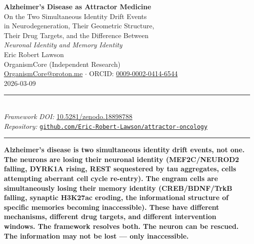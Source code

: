\documentclass[12pt,a4paper]{article}
\newenvironment{claimenv}{%
  \begin{tcolorbox}[colback=claimbox,colframe=claimbox,coltext=white,
    boxrule=0pt,arc=3pt,left=8pt,right=8pt,top=6pt,bottom=6pt,breakable]
  \bfseries\centering}{%
  \end{tcolorbox}}
\begin{document}

\begin{center}
  {\LARGE\bfseries\color{headerblue}
    Alzheimer's Disease as Attractor Medicine}\\[0.6em]

  {\large
    On the Two Simultaneous Identity Drift Events\\
    in Neurodegeneration, Their Geometric Structure,\\
    Their Drug Targets, and the Difference Between\\[0.3em]
    \textit{Neuronal Identity and Memory Identity}}\\[1.0em]

  {\normalsize Eric Robert Lawson}\\[0.2em]
  {\small OrganismCore (Independent Research)\\
    \href{mailto:OrganismCore@proton.me}{OrganismCore@proton.me}
    \quad$\cdot$\quad
    ORCID: \href{https://orcid.org/0009-0002-0414-6544}
      {0009-0002-0414-6544}}\\[0.5em]

  {\small 2026-03-09}\\[0.7em]
  \rule{0.6\linewidth}{0.4pt}\\[0.5em]

  {\footnotesize
    \textit{Framework DOI:}\;
    \href{https://doi.org/10.5281/zenodo.18898788}
      {10.5281/zenodo.18898788}\\[0.2em]
    \textit{Repository:}\;
    \href{https://github.com/Eric-Robert-Lawson/attractor-oncology}
      {\texttt{github.com/Eric-Robert-Lawson/attractor-oncology}}
  }\\[0.5em]
  \rule{0.6\linewidth}{0.4pt}
\end{center}

\vspace{0.5em}

\begin{claimenv}
Alzheimer's disease is two simultaneous identity drift events,
not one. The neurons are losing their neuronal identity
(MEF2C/NEUROD2 falling, DYRK1A rising, REST sequestered
by tau aggregates, cells attempting aberrant cell cycle
re-entry). The engram cells are simultaneously losing their
memory identity (CREB/BDNF/TrkB falling, synaptic
H3K27ac eroding, the informational structure of
specific memories becoming inaccessible). These have
different mechanisms, different drug targets, and
different intervention windows. The framework resolves both.
The neuron can be rescued. The information may not be
lost --- only inaccessible.
\end{claimenv}
\end{document}
